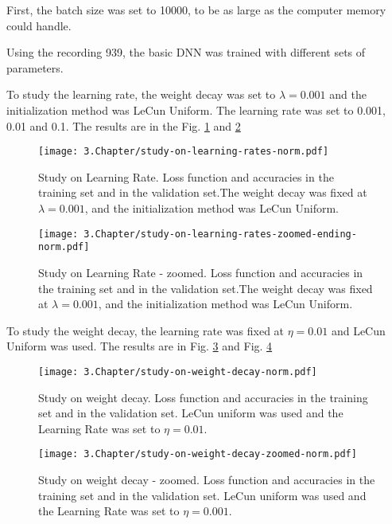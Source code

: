 First, the batch size was set to 10000, to be as large as the computer memory could handle.

Using the recording 939, the basic DNN was trained with different sets of parameters. 


To study the learning rate, the weight decay was set to $\lambda = 0.001$ and the initialization method was LeCun Uniform. The learning rate was set to 0.001, 0.01 and 0.1. The results are in the Fig. \ref{fig:study-LR} and \ref{fig:study-LR-zoomed}

\begin{figure}[htbp]
	\centering
	\texttt{[image: 3.Chapter/study-on-learning-rates-norm.pdf]}
	\caption{Study on Learning Rate. Loss function and accuracies in the training set and in the validation set.The weight decay was fixed at $\lambda = 0.001$, and the initialization method was LeCun Uniform.
}
\label{fig:study-LR}
\end{figure}

\begin{figure}[htbp]
	\centering
	\texttt{[image: 3.Chapter/study-on-learning-rates-zoomed-ending-norm.pdf]}
	\caption{Study on Learning Rate - zoomed. Loss function and accuracies in the training set and in the validation set.The weight decay was fixed at $\lambda = 0.001$, and the initialization method was LeCun Uniform.
}
\label{fig:study-LR-zoomed}
\end{figure}

To study the weight decay, the learning rate was fixed at $\eta = 0.01$ and LeCun Uniform was used. The results are in Fig. \ref{fig:study-weightdecays} and Fig. \ref{fig:study-weightdecays-zoomed}

\begin{figure}[htbp]
	\centering
	\texttt{[image: 3.Chapter/study-on-weight-decay-norm.pdf]}
	\caption{Study on weight decay. Loss function and accuracies in the training set and in the validation set. LeCun uniform was used and the Learning Rate was set to $\eta = 0.01$.
}
\label{fig:study-weightdecays}
\end{figure}

\begin{figure}[htbp]
	\centering
	\texttt{[image: 3.Chapter/study-on-weight-decay-zoomed-norm.pdf]}
	\caption{Study on weight decay - zoomed. Loss function and accuracies in the training set and in the validation set. LeCun uniform was used and the Learning Rate was set to $\eta = 0.001$.
}
\label{fig:study-weightdecays-zoomed}
\end{figure}


